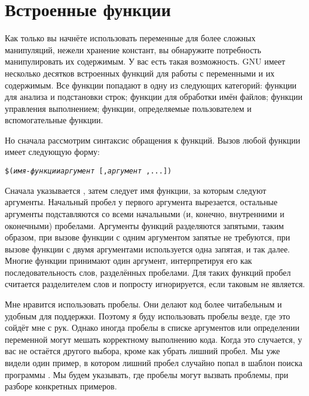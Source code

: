\section{Встроенные функции}
\label{sec:built_in_func}

Как только вы начнёте использовать переменные для более сложных
манипуляций, нежели хранение констант, вы обнаружите потребность
манипулировать их содержимым. У вас есть такая возможность. GNU
\GNUmake{} имеет несколько десятков встроенных функций для работы с
переменными и их содержимым. Все функции попадают в одну из следующих
категорий: функции для анализа и подстановки строк; функции для
обработки имён файлов; функции управления выполнением; функции,
определяемые пользователем и вспомогательные функции.

Но сначала рассмотрим синтаксис обращения к функций. Вызов любой
функции имеет следующую форму:

{\footnotesize
\begin{alltt}
\$(\emph{имя-функции} \emph{аргумент\,} [, \emph{аргумент\,}, ...])
\end{alltt}
}

Сначала указывается \variable{\${}(}, затем следует имя функции, за
которым следуют аргументы. Начальный пробел у первого аргумента
вырезается, остальные аргументы подставляются со всеми начальными (и,
конечно, внутренними и оконечными) пробелами.  Аргументы функций
разделяются запятыми, таким образом, при вызове функции с одним
аргументом запятые не требуются, при вызове функции с двумя
аргументами используется одна запятая, и так далее. Многие функции
принимают один аргумент, интерпретируя его как последовательность
слов, разделённых пробелами. Для таких функций пробел считается
разделителем слов и попросту игнорируется, если таковым не является.

Мне нравится использовать пробелы. Они делают код более читабельным и
удобным для поддержки. Поэтому я буду использовать пробелы везде, где
это сойдёт мне с рук. Однако иногда пробелы в списке аргументов или
определении переменной могут мешать корректному выполнению кода.
Когда это случается, у вас не остаётся другого выбора, кроме как
убрать лишний пробел. Мы уже видели один пример, в котором лишний
пробел случайно попал в шаблон поиска программы .  Мы
будем указывать, где пробелы могут вызвать проблемы, при разборе
конкретных примеров.

